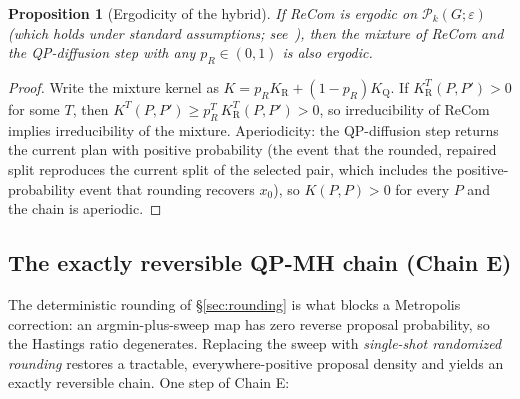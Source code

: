 \documentclass[11pt]{article}
\newtheorem{proposition}{Proposition}[section]
\begin{document}
\begin{proposition}[Ergodicity of the hybrid]\label{prop:ergodic}
If ReCom is ergodic on $\mathcal{P}_k(G; \varepsilon)$ (which holds
under standard assumptions; see~\cite{deford2021recombination,
cannon2024irreducibility}), then the mixture of ReCom and
the QP-diffusion step with any $p_R \in (0, 1)$ is also ergodic.
\end{proposition}

\begin{proof}
Write the mixture kernel as $K = p_R K_{\mathrm{R}} +
(1 - p_R) K_{\mathrm{Q}}$. If $K_{\mathrm{R}}^{T}(P, P') > 0$ for
some $T$, then $K^{T}(P, P') \ge p_R^{T}\, K_{\mathrm{R}}^{T}(P, P')
> 0$, so irreducibility of ReCom implies irreducibility of the
mixture. Aperiodicity: the QP-diffusion step returns the current
plan with positive probability (the event that the rounded, repaired
split reproduces the current split of the selected pair, which
includes the positive-probability event that rounding recovers
$x_0$), so $K(P, P) > 0$ for every $P$ and the chain is aperiodic.
\end{proof}

\subsection{The exactly reversible QP-MH chain (Chain E)}\label{sec:qp-mh}

The deterministic rounding of \S\ref{sec:rounding} is what blocks a
Metropolis correction: an argmin-plus-sweep map has zero reverse
proposal probability, so the Hastings ratio degenerates. Replacing the
sweep with \emph{single-shot randomized rounding} restores a tractable,
everywhere-positive proposal density and yields an exactly reversible
chain. One step of Chain E:
\end{document}
